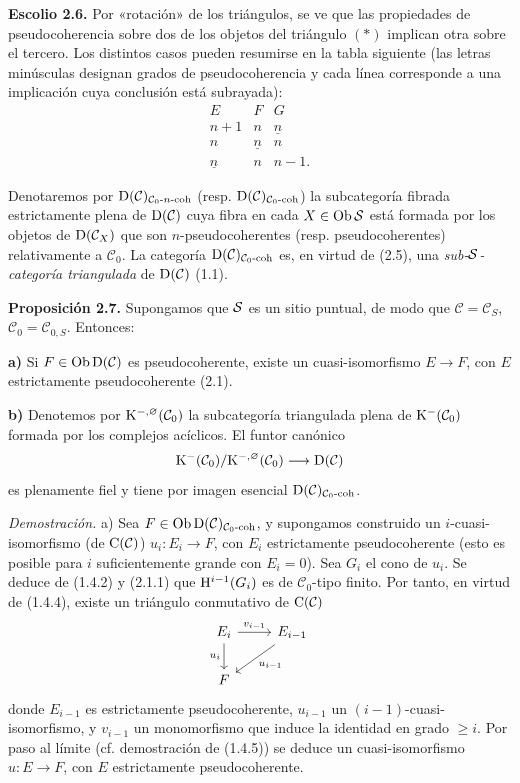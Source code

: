 \textbf{Escolio 2.6.} Por «rotación» de los triángulos, se ve que las propiedades de pseudocoherencia sobre dos de los objetos del triángulo \((*)\) implican otra sobre el tercero. Los distintos casos pueden resumirse en la tabla siguiente (las letras minúsculas designan grados de pseudocoherencia y cada línea corresponde a una implicación cuya conclusión está subrayada):
\[
\begin{array}{ccc}
E&F&G\\[0.2em]
n+1&n&\underline n\\
n&\underline n&n\\
\underline n&n&n-1 .
\end{array}
\]

Denotaremos por \(\Dpx(\mathcal C)_{\mathcal C_0\text{-}n\text{-coh}}\) (resp. \(\Dpx(\mathcal C)_{\mathcal C_0\text{-}\mathrm{coh}}\)) la subcategoría fibrada estrictamente plena de \(\Dpx(\mathcal C)\) cuya fibra en cada \(X\in\Ob \sisi{S}{\mathcal S}\) está formada por los objetos de \(\Dpx(\mathcal C_X)\) que son \(n\)-pseudocoherentes (resp. pseudocoherentes) relativamente a \(\mathcal C_0\). La categoría \(\Dpx(\mathcal C)_{\mathcal C_0\text{-}\mathrm{coh}}\) es, en virtud de (2.5), una \emph{sub-\(\sisi{S}{\mathcal S}\)-categoría triangulada} de \(\Dpx(\mathcal C)\) (1.1).

\textbf{Proposición 2.7.} Supongamos que \(\sisi{S}{\mathcal S}\) es un sitio puntual, de modo que \(\mathcal C=\mathcal C_S\), \(\mathcal C_0=\mathcal C_{0,S}\). Entonces:

\textbf{a)} Si \(F\in\Ob\Dpx(\mathcal C)\) es pseudocoherente, existe un cuasi-isomorfismo \(E\longrightarrow F\), con \(E\) estrictamente pseudocoherente (2.1).

\textbf{b)} Denotemos por \(\Kpx^{-,\varnothing}(\mathcal C_0)\) la subcategoría triangulada plena de \(\Kpx^-(\mathcal C_0)\) formada por los complejos acíclicos. El funtor canónico
\[
  \Kpx^-(\mathcal C_0)/\Kpx^{-,\varnothing}(\mathcal C_0)
  \longrightarrow \Dpx(\mathcal C)
\]
es plenamente fiel y tiene por imagen esencial \(\Dpx(\mathcal C)_{\mathcal C_0\text{-}\mathrm{coh}}\).

\emph{Demostración.} a) Sea \(F\in\Ob\Dpx(\mathcal C)_{\mathcal C_0\text{-}\mathrm{coh}}\), y supongamos construido un \(i\)-cuasi-isomorfismo (de \(\Cpx(\mathcal C)\)) \(u_i:E_i\longrightarrow F\), con \(E_i\) estrictamente pseudocoherente (esto es posible para \(i\) suficientemente grande con \(E_i=0\)). Sea \(G_i\) el cono de \(u_i\). Se deduce de (1.4.2) y (2.1.1) que \(\Ho^{i-1}(G_i)\) es de \(\mathcal C_0\)-tipo finito. Por tanto, en virtud de (1.4.4), existe un triángulo conmutativo de \(\Cpx(\mathcal C)\)
\[
\begin{tikzcd}
E_i \arrow[r,"v_{i-1}"] \arrow[d,"u_i"'] & E_{i-1} \arrow[dl,"u_{i-1}"]\\
F &
\end{tikzcd}
\]
donde \(E_{i-1}\) es estrictamente pseudocoherente, \(u_{i-1}\) un \((i-1)\)-cuasi-isomorfismo, y \(v_{i-1}\) un monomorfismo que induce la identidad en grado \(\geq i\). Por paso al límite (cf. demostración de (1.4.5)) se deduce un cuasi-isomorfismo \(u:E\to F\), con \(E\) estrictamente pseudocoherente.

